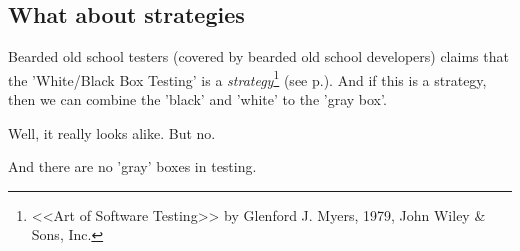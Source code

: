 \subsection{What about strategies}

Bearded old school testers (covered by bearded old school developers) claims that the 'White/Black Box Testing' is a \emph{strategy}\footnote{<<Art of Software Testing>> by Glenford J. Myers, 1979, John Wiley \& Sons, Inc.} (see  p.\pageref{sec:Strategy}). And if this is a strategy, then we can combine the 'black' and 'white' to the 'gray box'.

Well, it really looks alike. But no.

And there are no 'gray' boxes in testing.